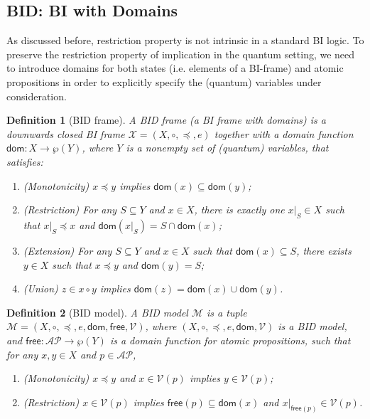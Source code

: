 \documentclass[conference,compsoc, 10pt]{IEEEtran}
\newtheorem{definition}{Definition}[section]
\newcommand {\cM } {{\mathcal{M}}}
\newcommand {\cV } {{\mathcal{V}}}
\newcommand {\cX } {{\mathcal{X}}}
\newcommand {\LTypeEs } {{\mathsf{dom}}}
\newcommand {\LTypeE }[1] {{\mathsf{dom}\!\left(#1\right)}}
\newcommand {\LTypeFs } {{\mathsf{free}}}
\newcommand {\LTypeF }[1] {{\mathsf{free}{\left(#1\right)}}}
\newcommand {\rt }[2] {{\left.{#1}\right|_{#2}}}
\newcommand {\AP} {{\mathcal{AP}}}
\begin{document}
\begin{appendices}
		\subsection{BID: BI with Domains}
		
		As discussed before, restriction property is not intrinsic in a standard BI logic. 
		To preserve the restriction property of implication in the quantum setting, we need to introduce domains for both states (i.e. elements of a BI-frame) and atomic propositions in order to explicitly specify the (quantum) variables under consideration.    
		\begin{definition}[BID frame]
			\label{def BID frame}
			A BID frame (a BI frame with domains) is a \emph{downwards closed} BI frame $\cX = (X,\circ,\preceq,e)$ together with a domain function $\LTypeEs: X\rightarrow \wp(Y)$, where $Y$ is a nonempty set of (quantum) variables, that satisfies: 
			\begin{enumerate}
				\item (Monotonicity) $x\preceq y$ implies $\LTypeE{x}\subseteq\LTypeE{y}$;
				\item (Restriction) For any $S\subseteq Y$ and $x\in X$, there is exactly one $\rt{x}{S}\in X$ such that $\rt{x}{S}\preceq x$ and $\LTypeE{\rt{x}{S}} = S\cap\LTypeE{x}$;
				\item (Extension) For any $S\subseteq Y$ and $x\in X$ such that $\LTypeE{x}\subseteq S$, there exists $y\in X$ such that $x\preceq y$ and $\LTypeE{y} = S$;
				\item (Union) $z\in x\circ y$ implies $\LTypeE{z} = \LTypeE{x}\cup \LTypeE{y}$.
			\end{enumerate}
		\end{definition}	
		
		\begin{definition}[BID model]
			\label{def BID model}
			A BID model $\cM$ is a tuple $\cM = (X,\circ,\preceq,e,\LTypeEs, \LTypeFs,\cV)$, where $(X,\circ,\preceq, e,\LTypeEs,\cV)$ is a BID model, and  $\LTypeFs:\AP\rightarrow \wp(Y)$ is a domain function for atomic propositions, such that for any $x,y\in X$ and $p\in\AP$,
			\begin{enumerate}
				\item (Monotonicity) $x\preceq y$ and $x\in\cV(p)$ implies $y\in\cV(p)$;
				\item (Restriction) $x\in\cV(p)$ implies $\LTypeF{p}\subseteq\LTypeE{x}$ and $\rt{x}{\LTypeF{p}}\in\cV(p)$.
			\end{enumerate}
		\end{definition}
		

\end{appendices}
\end{document}
